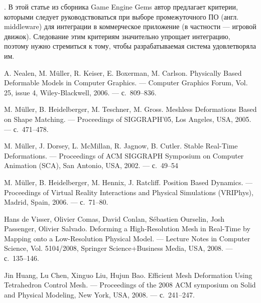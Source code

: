 \documentclass[a4paper,11pt]{report}
\begin{document}
    \cite[What to Look for When Evaluating Middleware for Integration]{gems-middleware}. В
      этой статье из сборника {\English Game Engine Gems} автор предлагает критерии, которыми
      следует руководствоваться при выборе промежуточного ПО (англ. {\English middleware}) для интеграции в
      коммерческое приложение (в частности --- игровой движок). Следование этим критериям
      значительно упрощает интеграцию, поэтому нужно стремиться к тому, чтобы разрабатываемая
      система удовлетворяла им.

  \begin{thebibliography}{9}
      A. Nealen, M. Müller, R. Keiser, E. Boxerman, M. Carlson.
      \newblock Physically Based Deformable Models in Computer Graphics.
      \newblock --- Computer Graphics Forum, Vol. 25, issue 4, Wiley-Blackwell, 2006.
      \newblock --- с.~809--836.

      M. Müller, B. Heidelberger, M. Teschner, M. Gross.
      \newblock Meshless Deformations Based on Shape Matching.
      \newblock --- Proceedings of SIGGRAPH'05, Los Angeles, USA, 2005.
      \newblock --- с.~471--478.

      M. Müller, J. Dorsey, L. McMillan, R. Jagnow, B. Cutler.
      \newblock Stable Real-Time Deformations.
      \newblock --- Proceedings of ACM SIGGRAPH Symposium on Computer Animation (SCA), San Antonio,
                    USA, 2002.
      \newblock --- с.~49--54

      M. Müller, B. Heidelberger, M. Hennix, J. Ratcliff.
      \newblock Position Based Dynamics.
      \newblock --- Proceedings of Virtual Reality Interactions and Physical Simulations (VRIPhys),
                    Madrid, Spain, 2006.
      \newblock --- с.~71--80.

      Hans de Visser, Olivier Comas, David Conlan, Sébastien Ourselin, Josh Passenger, Olivier Salvado.
      \newblock Deforming a High-Resolution Mesh in Real-Time by Mapping onto a Low-Resolution Physical Model.
      \newblock --- Lecture Notes in Computer Science, Vol. 5104/2008, Springer Science+Business Media,
                    USA, 2008.
      \newblock --- с.~135--146.

      Jin Huang, Lu Chen, Xinguo Liu, Hujun Bao.
      \newblock Efficient Mesh Deformation Using Tetrahedron Control Mesh.
      \newblock --- Proceedings of the 2008 ACM symposium on Solid and Physical Modeling, New York,
                    USA, 2008.
      \newblock --- с.~241--247.


\end{thebibliography}
\end{document}
